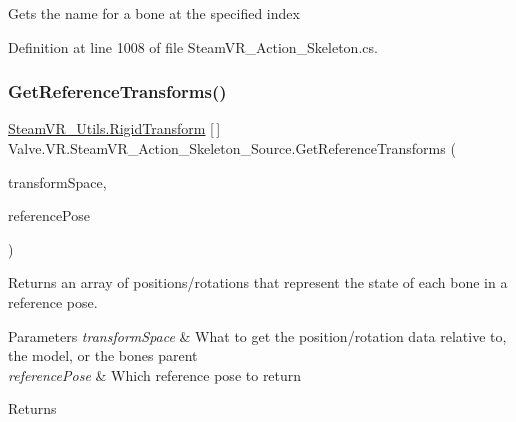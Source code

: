 Gets the name for a bone at the specified index 



Definition at line 1008 of file Steam\+V\+R\+\_\+\+Action\+\_\+\+Skeleton.\+cs.

\mbox{\label{class_valve_1_1_v_r_1_1_steam_v_r___action___skeleton___source_ac42e201722ec04380743a0425efa9d1d}} 
\subsubsection{\texorpdfstring{GetReferenceTransforms()}{GetReferenceTransforms()}}
{\footnotesize\ttfamily \mbox{\hyperlink{struct_valve_1_1_v_r_1_1_steam_v_r___utils_1_1_rigid_transform}{Steam\+V\+R\+\_\+\+Utils.\+Rigid\+Transform}} \mbox{[}$\,$\mbox{]} Valve.\+V\+R.\+Steam\+V\+R\+\_\+\+Action\+\_\+\+Skeleton\+\_\+\+Source.\+Get\+Reference\+Transforms (\begin{DoxyParamCaption}\item[{\mbox{\hyperlink{namespace_valve_1_1_v_r_a916744fb3fc7b8e8ba224fba9bee6de4}{E\+V\+R\+Skeletal\+Transform\+Space}}}]{transform\+Space,  }\item[{\mbox{\hyperlink{namespace_valve_1_1_v_r_a299b655881f873256f035349b59da09e}{E\+V\+R\+Skeletal\+Reference\+Pose}}}]{reference\+Pose }\end{DoxyParamCaption})}



Returns an array of positions/rotations that represent the state of each bone in a reference pose. 


\begin{DoxyParams}{Parameters}
{\em transform\+Space} & What to get the position/rotation data relative to, the model, or the bone\textquotesingle{}s parent\\
\hline
{\em reference\+Pose} & Which reference pose to return\\
\hline
\end{DoxyParams}
\begin{DoxyReturn}{Returns}

\end{DoxyReturn}


